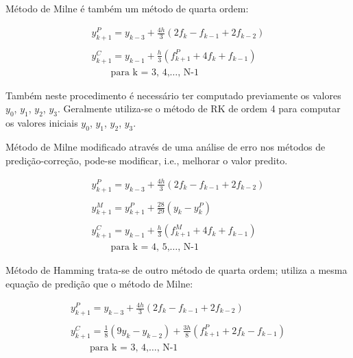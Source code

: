 Método de Milne é também um método de quarta ordem: 

\begin{equation*}
\begin{split}
y^{P}_{k+1} = y_{k-3} + \frac{4h}{3}(2f_{k} - f_{k-1} + 2f_{k-2})\\
\\
y^{C}_{k+1} = y_{k-1} + \frac{h}{3}(f^{P}_{k+1} + 4f_{k} + f_{k-1})\\
\qquad \text{para k = 3, 4,$\dotsc$, N-1}
\end{split}
\end{equation*}

Também neste procedimento é necessário ter computado previamente os valores $y_{0}$, $y_{1}$, $y_{2}$, $y_{3}$.
Geralmente utiliza-se o método de RK de ordem 4 para computar os valores iniciais $y_{0}$, $y_{1}$, $y_{2}$, $y_{3}$.

Método de Milne modificado através de uma análise de erro nos métodos
de predição-correção, pode-se modificar, i.e., melhorar o valor predito. 

\begin{equation*}
\begin{split}
y^{P}_{k+1} = y_{k-3} + \frac{4h}{3}(2f_{k} - f_{k-1} + 2f_{k-2})\\
\\
y^{M}_{k+1} = y^{P}_{k+1} + \frac{28}{29}(y_{k} - y^{P}_{k})\\
\\
y^{C}_{k+1} = y_{k-1} + \frac{h}{3}(f^{M}_{k+1} + 4f_{k} + f_{k-1})\\
\qquad \text{para k = 4, 5,$\dotsc$, N-1}
\end{split}
\end{equation*} 

Método de Hamming trata-se de outro método de quarta ordem; utiliza
a mesma equação de predição que o método de Milne:

\begin{equation*}
\begin{split}
y^{P}_{k+1} = y_{k-3} + \frac{4h}{3}(2f_{k} - f_{k-1} + 2f_{k-2})\\
\\
y^{C}_{k+1} = \frac{1}{8}(9y_{k} - y_{k-2}) + \frac{3h}{8}(f^{P}_{k+1} + 2f_{k} - f_{k-1})\\
\qquad \text{para k = 3, 4,$\dotsc$, N-1}
\end{split}
\end{equation*}

